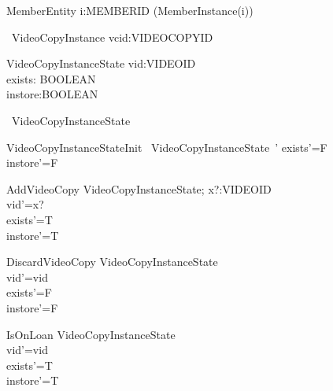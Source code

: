 \documentclass{article}
\begin{document}
\begin{circus}
    \circprocess MemberEntity \circdef  i:MEMBERID \circspot (MemberInstance(i))  \\
\end{circus}


\begin{circus}
    \circprocess\ VideoCopyInstance \circdef vcid:VIDEOCOPYID \circspot \circbegin
\end{circus}

\begin{schema}{VideoCopyInstanceState}
	vid:VIDEOID \\
	exists: BOOLEAN\\
	instore:BOOLEAN\\
\end{schema}

\begin{circusaction}
   \circstate\ VideoCopyInstanceState
\end{circusaction}

\begin{schema}{VideoCopyInstanceStateInit}
    ~VideoCopyInstanceState~'
\where
    exists'=F \\
    instore'=F \\
\end{schema}

\begin{schema}{AddVideoCopy}
   \Delta VideoCopyInstanceState; x?:VIDEOID\\
    \where
    	vid'=x?\\
	exists'=T\\
	instore'=T\\
\end{schema}

\begin{schema}{DiscardVideoCopy}
   \Delta VideoCopyInstanceState \\
    \where
    vid'=vid\\
    exists'=F\\
    instore'=F\\
\end{schema}

\begin{schema}{IsOnLoan}
   \Delta VideoCopyInstanceState \\
    \where
    vid'=vid\\
    exists'=T\\
    instore'=T\\
\end{schema}
\end{document}
